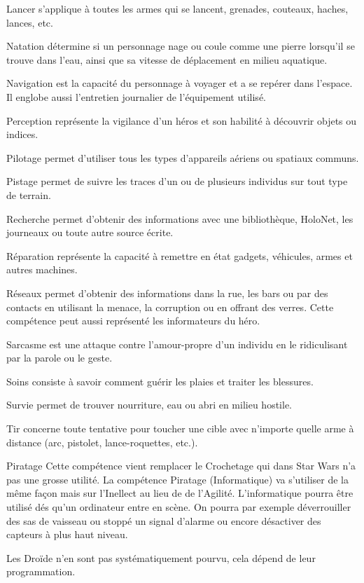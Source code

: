 \begin{description}[align=left]
    \item [Lancer (Agi)]
        Lancer s’applique à toutes les armes qui se lancent, grenades, couteaux, haches, lances, etc.
    \item [Natation (Agi)]
        Natation détermine si un personnage nage ou coule comme une pierre lorsqu’il se trouve dans l’eau, ainsi que sa vitesse de déplacement en milieu aquatique.
    \item [Navigation (Int)]
        Navigation est la capacité du personnage à voyager et a se repérer dans l'espace. Il englobe aussi l'entretien journalier de l'équipement utilisé.
    \item [Perception (Int)]
        Perception représente la vigilance d’un héros et son habilité à découvrir objets ou indices.
    \item [Pilotage (Agi)]
        Pilotage permet d’utiliser tous les types d’appareils aériens ou spatiaux communs.
    \item [Pistage (Int)]
        Pistage permet de suivre les traces d’un ou de plusieurs individus sur tout type de terrain.
    \item [Recherche (Int)]
        Recherche permet d’obtenir des informations avec une bibliothèque, HoloNet, les journeaux ou toute autre source écrite.
    \item [Réparation (Int)]
        Réparation représente la capacité à remettre en état gadgets, véhicules, armes et autres machines.
    \item [Réseaux (Int)]
        Réseaux permet d’obtenir des informations dans la rue, les bars ou par des contacts en utilisant la menace, la corruption ou en offrant des verres. Cette compétence peut aussi représenté les informateurs du héro.
    \item [Sarcasme (Int)]
        Sarcasme est une attaque contre l’amour-propre d’un individu en le ridiculisant par la parole ou le geste.
    \item [Soins (Int)]
        Soins consiste à savoir comment guérir les plaies et traiter les blessures.
    \item [Survie (Int)]
        Survie permet de trouver nourriture, eau ou abri en milieu hostile.
    \item [Tir (Agi)]
        Tir concerne toute tentative pour toucher une cible avec n’importe quelle arme à distance (arc, pistolet, lance-roquettes, etc.).
\end{description}

\begin{paperbox}{Piratage}
    Cette compétence vient remplacer le Crochetage qui dans Star Wars n'a pas une grosse utilité. La compétence Piratage (Informatique) va s'utiliser de la même façon mais sur l'Inellect au lieu de de l'Agilité. L'informatique pourra être utilisé dés qu'un ordinateur entre en scène. On pourra par exemple déverrouiller des sas de vaisseau ou stoppé un signal d'alarme ou encore désactiver des capteurs à plus haut niveau.

    Les Droïde n'en sont pas systématiquement pourvu, cela dépend de leur programmation.
\end{paperbox}

